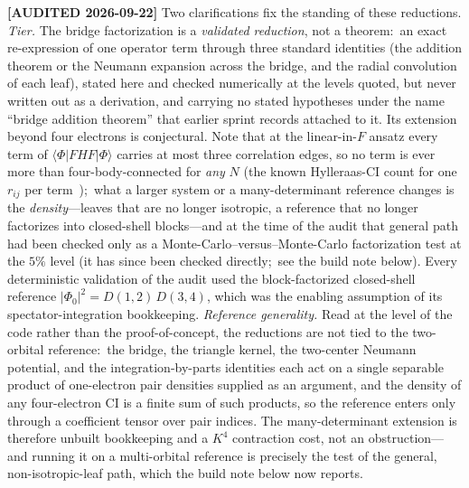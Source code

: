 \documentclass[aps,pra,twocolumn,superscriptaddress,longbibliography]{revtex4-2}
\begin{document}
\textbf{[AUDITED 2026-09-22]} Two clarifications fix the standing of these
reductions.  \emph{Tier.}  The bridge factorization is a \emph{validated
reduction}, not a theorem:\ an exact re-expression of one operator term through
three standard identities (the addition theorem or the Neumann expansion across
the bridge, and the radial convolution of each leaf), stated here and checked
numerically at the levels quoted, but never written out as a derivation, and
carrying no stated hypotheses under the name ``bridge addition theorem'' that
earlier sprint records attached to it.  Its extension beyond four electrons is
conjectural.  Note that at the linear-in-$F$ ansatz every term of
$\langle\Phi|FHF|\Phi\rangle$ carries at most three correlation edges, so no
term is ever more than four-body-connected for \emph{any} $N$ (the known
Hylleraas-CI count for one $r_{ij}$ per term~\cite{RuizSimsPadhy2021});\ what a larger
system or a many-determinant reference changes is the \emph{density}---leaves
that are no longer isotropic, a reference that no longer factorizes into
closed-shell blocks---and at the time of the audit that general path had been
checked only as a Monte-Carlo--versus--Monte-Carlo factorization test at the
$5\%$ level (it has since been checked directly;\ see the build note below).
Every deterministic validation of the audit used the block-factorized
closed-shell reference $|\Phi_0|^2=D(1,2)\,D(3,4)$, which was the enabling
assumption of its spectator-integration bookkeeping.  \emph{Reference generality.}  Read at the
level of the code rather than the proof-of-concept, the reductions are not tied
to the two-orbital reference:\ the bridge, the triangle kernel, the two-center
Neumann potential, and the integration-by-parts identities each act on a single
separable product of one-electron pair densities supplied as an argument, and
the density of any four-electron CI is a finite sum of such products, so the
reference enters only through a coefficient tensor over pair indices.  The
many-determinant extension is therefore unbuilt bookkeeping and a $K^4$
contraction cost, not an obstruction---and running it on a multi-orbital
reference is precisely the test of the general, non-isotropic-leaf path, which
the build note below now reports.
\end{document}
